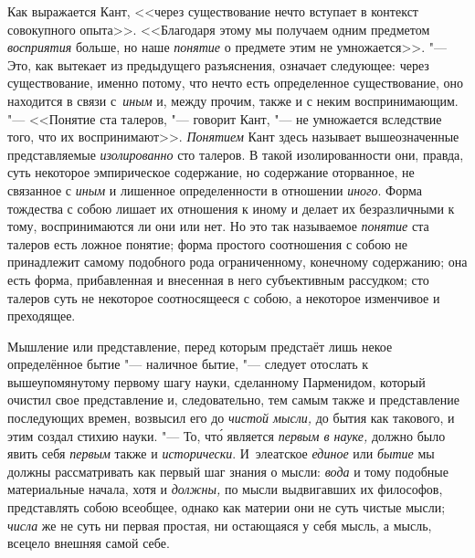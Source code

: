 Как выражается Кант, <<через существование нечто вступает в контекст
совокупного опыта>>. <<Благодаря этому мы получаем одним предметом
{\em восприятия} больше, но наше {\em понятие} о предмете этим не
умножается>>. "--- Это, как вытекает из
предыдущего разъяснения, означает следующее: через существование, именно
потому, что нечто есть определенное существование, оно находится в связи
с~{\em иным} и, между прочим, также и с неким воспринимающим. "--- <<Понятие
ста талеров, "--- говорит Кант, "--- не умножается вследствие того, что их
воспринимают>>. {\em Понятием} Кант здесь называет вышеозначенные
представляемые {\em изолированно} сто талеров. В такой изолированности они,
правда, суть некоторое эмпирическое содержание, но содержание оторванное, не
связанное с {\em иным} и лишенное определенности в отношении {\em иного}. Форма
тождества с собою лишает их отношения к иному и делает их безразличными к тому,
воспринимаются ли они или нет. Но это так называемое {\em понятие} ста талеров
есть ложное понятие; форма простого соотношения с собою не принадлежит самому
подобного рода ограниченному, конечному содержанию; она есть форма,
прибавленная и внесенная в него субъективным рассудком; сто талеров суть не
некоторое соотносящееся с собою, а некоторое изменчивое и преходящее.

Мышление или представление, перед которым предстаёт лишь некое определённое бытие
"--- наличное бытие, "--- следует отослать к вышеупомянутому первому шагу
науки, сделанному Парменидом, который очистил свое представление и,
следовательно, тем самым также и представление последующих времен, возвысил его
до {\em чистой мысли,} до бытия как такового, и этим создал стихию науки. "---
То, чт\'{о} является {\em первым в науке,} должно было явить себя {\em первым} также
и {\em исторически}. И~элеатское {\em единое} или {\em бытие} мы должны
рассматривать как первый шаг знания о мысли: {\em вода} и тому подобные материальные
начала, хотя и {\em должны,} по мысли выдвигавших их философов, представлять
собою всеобщее, однако как материи они не суть чистые мысли;
{\em числа} же не суть ни первая простая, ни остающаяся у себя мысль, а мысль,
всецело внешняя самой себе.

